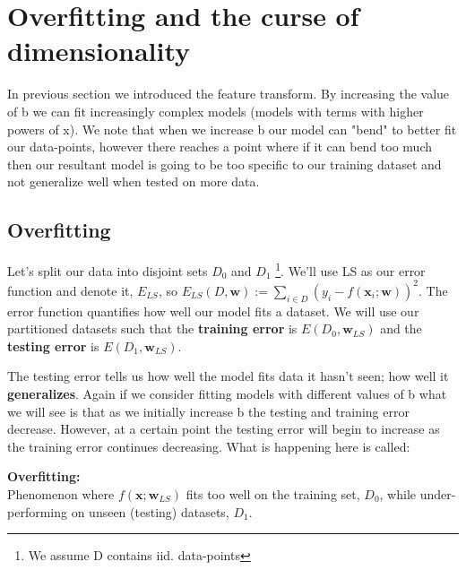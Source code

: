 \section{Overfitting and the curse of dimensionality}
In previous section we introduced the feature transform. By increasing the value of b we can fit increasingly complex models (models with terms with higher powers of x). We note that when we increase b our model can "bend" to better fit our data-points, however there reaches a point where if it can bend too much then our resultant model is going to be too specific to our training dataset and not generalize well when tested on more data.

\subsection{Overfitting}
Let's split our data into disjoint sets $D_{0}$ and $D_{1}$ \footnote{We assume D contains iid. data-points}. We'll use LS as our error function and denote it, $E_{LS}$, so $E_{LS}(D, \bm{w}) := \sum_{i \in D} (y_{i} - f(\bm{x}_{i}; \bm{w}))^{2}$. The error function quantifies how well our model fits a dataset. We will use our partitioned datasets such that the \textbf{training error} is $E(D_{0}, \bm{w}_{LS})$ and the \textbf{testing error} is $E(D_{1}, \bm{w}_{LS})$.

The testing error tells us how well the model fits data it hasn't seen; how well it \textbf{generalizes}. Again if we consider fitting models with different values of b what we will see is that as we initially increase b the testing and training error decrease. However, at a certain point the testing error will begin to increase as the training error continues decreasing. What is happening here is called:
\begin{definition}
    \textbf{Overfitting:} \\
    Phenomenon where $f(\bm{x};\bm{w}_{LS})$ fits too well on the training set, $D_{0}$, while under-performing on unseen (testing) datasets, $D_{1}$.
\end{definition}

